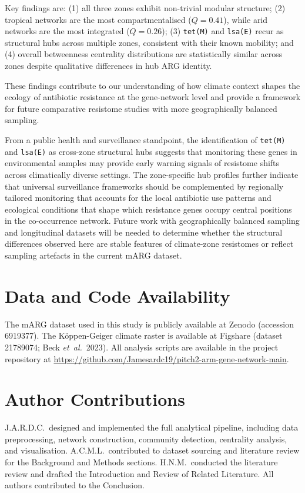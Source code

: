 \documentclass[12pt,a4paper]{article}
\begin{document}
Key findings are: (1) all three zones exhibit non-trivial modular
structure; (2) tropical networks are the most compartmentalised
($Q = 0.41$), while arid networks are the most integrated
($Q = 0.26$); (3) \texttt{tet(M)} and \texttt{lsa(E)} recur as
structural hubs across multiple zones, consistent with their known
mobility; and (4) overall betweenness centrality distributions are
statistically similar across zones despite qualitative differences
in hub ARG identity.

These findings contribute to our understanding of how climate context
shapes the ecology of antibiotic resistance at the gene-network level
and provide a framework for future comparative resistome studies with
more geographically balanced sampling.

From a public health and surveillance standpoint, the identification of
\texttt{tet(M)} and \texttt{lsa(E)} as cross-zone structural hubs
suggests that monitoring these genes in environmental samples may
provide early warning signals of resistome shifts across climatically
diverse settings.
The zone-specific hub profiles further indicate that universal
surveillance frameworks should be complemented by regionally tailored
monitoring that accounts for the local antibiotic use patterns and
ecological conditions that shape which resistance genes occupy central
positions in the co-occurrence network.
Future work with geographically balanced sampling and longitudinal
datasets will be needed to determine whether the structural differences
observed here are stable features of climate-zone resistomes or reflect
sampling artefacts in the current mARG dataset.

\section*{Data and Code Availability}

The mARG dataset used in this study is publicly available at Zenodo
(accession 6919377).
The K\"oppen-Geiger climate raster is available at Figshare
(dataset 21789074; Beck \emph{et~al.}\ 2023).
All analysis scripts are available in the project repository at
\url{https://github.com/Jamesardc19/pitch2-arm-gene-network-main}.

\section*{Author Contributions}

J.A.R.D.C.\ designed and implemented the full analytical pipeline,
including data preprocessing, network construction, community
detection, centrality analysis, and visualisation.
A.C.M.L.\ contributed to dataset sourcing and literature review for
the Background and Methods sections.
H.N.M.\ conducted the literature review and drafted the Introduction
and Review of Related Literature.
All authors contributed to the Conclusion.


\newpage
%
%
\end{document}
